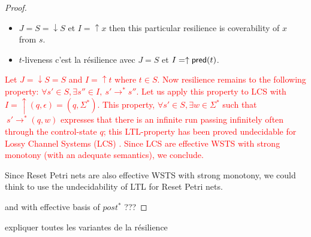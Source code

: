 \begin{proof}

\begin{itemize}
\item $J=S= \downarrow S$ et $I=\uparrow x$ then this particular resilience is coverability of $x$ from $s$.

\item $t$-liveness c'est la résilience avec $J=S$ et $I = \uparrow \textsf{pred}(t)$.
\end{itemize}

\textcolor{red}{  Let $J=\downarrow S = S$ and $I = \uparrow t$ where $t \in S$. Now resilience remains to the following property: $\forall s' \in S,  \exists s'' \in I, ~ s' \rightarrow^{*} s''$. Let us apply this property to LCS with $I = \uparrow (q,\epsilon) = (q, \Sigma^*)$. This property, $\forall s' \in S,  \exists w \in \Sigma^* $ such that $ ~ s' \rightarrow^{*} (q,w)$ expresses that there is an infinite run passing infinitely often through the control-state $q$; this LTL-property has been proved undecidable for Lossy Channel Systems (LCS) \cite{DBLP:conf/icalp/AbdullaJ94}.
Since LCS are effective WSTS with strong monotony (with an adequate semantics), we conclude.}


Since Reset Petri nets are also effective WSTS with strong monotony, we could think to use the undecidability of LTL for Reset Petri nets.

and with effective basis of $post^*$ ???





\end{proof}

expliquer toutes les variantes de la résilience



